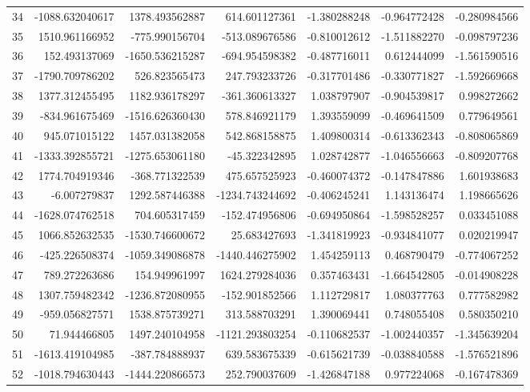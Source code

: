 \begin{longtable}{rrrrrrr}
34 & -1088.632040617 & 1378.493562887 & 614.601127361 & -1.380288248 & -0.964772428 & -0.280984566 \\
35 & 1510.961166952 & -775.990156704 & -513.089676586 & -0.810012612 & -1.511882270 & -0.098797236 \\
36 & 152.493137069 & -1650.536215287 & -694.954598382 & -0.487716011 & 0.612444099 & -1.561590516 \\
37 & -1790.709786202 & 526.823565473 & 247.793233726 & -0.317701486 & -0.330771827 & -1.592669668 \\
38 & 1377.312455495 & 1182.936178297 & -361.360613327 & 1.038797907 & -0.904539817 & 0.998272662 \\
39 & -834.961675469 & -1516.626360430 & 578.846921179 & 1.393559099 & -0.469641509 & 0.779649561 \\
40 & 945.071015122 & 1457.031382058 & 542.868158875 & 1.409800314 & -0.613362343 & -0.808065869 \\
41 & -1333.392855721 & -1275.653061180 & -45.322342895 & 1.028742877 & -1.046556663 & -0.809207768 \\
42 & 1774.704919346 & -368.771322539 & 475.657525923 & -0.460074372 & -0.147847886 & 1.601938683 \\
43 & -6.007279837 & 1292.587446388 & -1234.743244692 & -0.406245241 & 1.143136474 & 1.198665626 \\
44 & -1628.074762518 & 704.605317459 & -152.474956806 & -0.694950864 & -1.598528257 & 0.033451088 \\
45 & 1066.852632535 & -1530.746600672 & 25.683427693 & -1.341819923 & -0.934841077 & 0.020219947 \\
46 & -425.226508374 & -1059.349086878 & -1440.446275902 & 1.454259113 & 0.468790479 & -0.774067252 \\
47 & 789.272263686 & 154.949961997 & 1624.279284036 & 0.357463431 & -1.664542805 & -0.014908228 \\
48 & 1307.759482342 & -1236.872080955 & -152.901852566 & 1.112729817 & 1.080377763 & 0.777582982 \\
49 & -959.056827571 & 1538.875739271 & 313.588703291 & 1.390069441 & 0.748055408 & 0.580350210 \\
50 & 71.944466805 & 1497.240104958 & -1121.293803254 & -0.110682537 & -1.002440357 & -1.345639204 \\
51 & -1613.419104985 & -387.784888937 & 639.583675339 & -0.615621739 & -0.038840588 & -1.576521896 \\
52 & -1018.794630443 & -1444.220866573 & 252.790037609 & -1.426847188 & 0.977224068 & -0.167478369 \\

\end{longtable}
